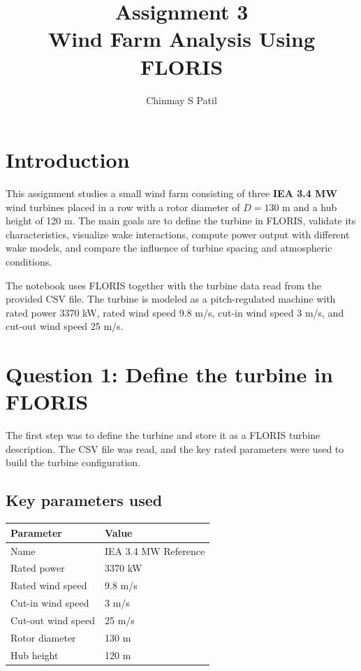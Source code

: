 \documentclass[11pt,a4paper]{article}
\title{\textbf{Assignment 3}\\\normalsize Wind Farm Analysis Using FLORIS}
\author{Chinmay S Patil}
\date{}
\begin{document}
	\maketitle
	
	\section{Introduction}
	This assignment studies a small wind farm consisting of three \textbf{IEA 3.4 MW} wind turbines placed in a row with a rotor diameter of $D = 130$ m and a hub height of 120 m. The main goals are to define the turbine in FLORIS, validate its characteristics, visualize wake interactions, compute power output with different wake models, and compare the influence of turbine spacing and atmospheric conditions.
	
	The notebook uses FLORIS together with the turbine data read from the provided CSV file. The turbine is modeled as a pitch-regulated machine with rated power 3370 kW, rated wind speed 9.8 m/s, cut-in wind speed 3 m/s, and cut-out wind speed 25 m/s.
	
	\section{Question 1: Define the turbine in FLORIS}
	The first step was to define the turbine and store it as a FLORIS turbine description. The CSV file was read, and the key rated parameters were used to build the turbine configuration.
	
	\subsection*{Key parameters used}
	\begin{center}
		\begin{tabular}{ll}
			\toprule
			Parameter & Value \\
			\midrule
			Name & IEA 3.4 MW Reference \\
			Rated power & 3370 kW \\
			Rated wind speed & 9.8 m/s \\
			Cut-in wind speed & 3 m/s \\
			Cut-out wind speed & 25 m/s \\
			Rotor diameter & 130 m \\
			Hub height & 120 m \\
			\bottomrule
		\end{tabular}
	\end{center}
	
\end{document}
